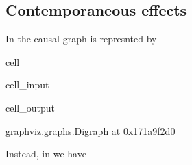 \documentclass[letterpaper,10pt,english]{jupyterBook}
\begin{document}
\subsection{Contemporaneous effects}
\label{\detokenize{notebooks/structural_breaks_example:contemporaneous-effects}}
\sphinxAtStartPar
In  the causal graph is represnted by

\begin{sphinxuseclass}{cell}\begin{sphinxVerbatimInput}

\begin{sphinxuseclass}{cell_input}
\begin{sphinxVerbatim}[commandchars=\\\{\}]
   

  \PYG{p}{[}\PYG{p}{[}  \PYG{p}{]}
              \PYG{p}{[}  \PYG{p}{]}
              \PYG{p}{[} \PYG{p}{]}\PYG{p}{]}

\end{sphinxVerbatim}

\end{sphinxuseclass}\end{sphinxVerbatimInput}
\begin{sphinxVerbatimOutput}

\begin{sphinxuseclass}{cell_output}
\begin{sphinxVerbatim}[commandchars=\\\{\}]
\PYGZlt{}graphviz.graphs.Digraph at 0x171a9f2d0\PYGZgt{}
\end{sphinxVerbatim}

\end{sphinxuseclass}\end{sphinxVerbatimOutput}

\end{sphinxuseclass}
\sphinxAtStartPar
Instead, in  we have
\end{document}
